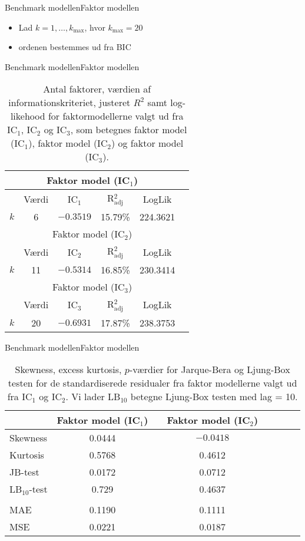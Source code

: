 \begin{frame}{Benchmark modellen}{Faktor modellen}
\begin{itemize}
\item Lad \(k = 1, \ldots, k_\text{max}\), hvor \(k_\text{max} = 20\)
\item ordenen bestemmes ud fra BIC
\end{itemize}

\end{frame}

\begin{frame}{Benchmark modellen}{Faktor modellen}
\begin{table}[h]
\center
\begin{tabular}{lccccc}
\toprule
\multicolumn{5}{c}{Faktor model (IC$_1$)} \\ \midrule
& Værdi &  IC$_1$ &  R$^2_{\text{adj}}$ & LogLik  \\
$k$ & 6 &  $-0.3519$ &  15.79\% &  224.3621  \\ \bottomrule \toprule
\multicolumn{5}{c}{Faktor model (IC$_2$)} \\ \midrule
 & Værdi &  IC$_2$ &  R$^2_{\text{adj}}$ & LogLik \\
 $k$ &11 & $-0.5314$ &  16.85\% &  230.3414 \\\bottomrule \toprule
\multicolumn{5}{c}{Faktor model (IC$_3$)} \\ \midrule
& Værdi &  IC$_3$ &  R$^2_{\text{adj}}$ & LogLik\\
$k$ & 20 & $-0.6931$ & 17.87\% & 238.3753 \\  \bottomrule
 \end{tabular}
 \caption{Antal faktorer, værdien af informationskriteriet, justeret \(R^2\) samt log-likehood for faktormodellerne valgt ud fra IC$_1$, IC$_2$ og IC$_3$, som betegnes faktor model (IC\(_1\)), faktor model (IC\(_2\)) og faktor model (IC\(_3\)).} \label{tab:est_faktor}
\end{table}
\end{frame}

\begin{frame}{Benchmark modellen}{Faktor modellen}
\begin{table}
\center
\begin{tabular}{lccccccc} \toprule
& Faktor model (IC$_1$) & & Faktor model (IC$_2$)  \\ \midrule
Skewness & 0.0444 & & $-0.0418$     \\
Kurtosis & 0.5768 & & 0.4612 \\
JB-test & 0.0172 & & 0.0712 \\ 
LB$_{10}$-test & 0.729  && 0.4637  \\ 
\\
MAE & 0.1190 & & 0.1111 \\ 
MSE &  0.0221  & & 0.0187 \\ \bottomrule
\end{tabular}
\caption{Skewness, excess kurtosis, $p$-værdier for Jarque-Bera og Ljung-Box testen for de standardiserede residualer fra faktor modellerne valgt ud fra IC$_1$ og IC$_2$. 
Vi lader LB$_{10}$ betegne Ljung-Box testen med lag = 10. } \label{tab:test_faktor}
\end{table}
\end{frame}

